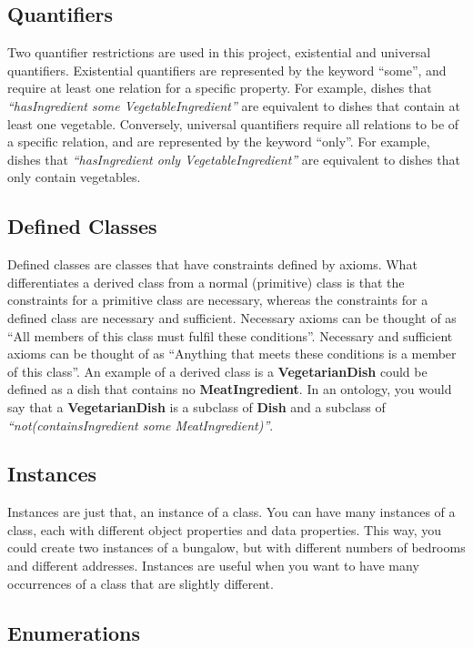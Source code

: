 \subsection{Quantifiers}

Two quantifier restrictions are used in this project, existential and universal quantifiers. Existential quantifiers are represented by the keyword ``some'', and require at least one relation for a specific property. For example, dishes that \textit{``hasIngredient some VegetableIngredient''} are equivalent to dishes that contain at least one vegetable. Conversely, universal quantifiers require all relations to be of a specific relation, and are represented by the keyword ``only''. For example, dishes that \textit{``hasIngredient only VegetableIngredient''} are equivalent to dishes that only contain vegetables.

\subsection{Defined Classes}

Defined classes are classes that have constraints defined by axioms. What differentiates a derived class from a normal (primitive) class is that the constraints for a primitive class are necessary, whereas the constraints for a defined class are necessary and sufficient. Necessary axioms can be thought of as ``All members of this class must fulfil these conditions''. Necessary and sufficient axioms can be thought of as ``Anything that meets these conditions is a member of this class''. An example of a derived class is a \textbf{VegetarianDish} could be defined as a dish that contains no \textbf{MeatIngredient}. In an ontology, you would say that a \textbf{VegetarianDish} is a subclass of \textbf{Dish} and a subclass of \textit{``not(containsIngredient some MeatIngredient)''}.

\subsection{Instances}

Instances are just that, an instance of a class. You can have many instances of a class, each with different object properties and data properties. This way, you could create two instances of a bungalow, but with different numbers of bedrooms and different addresses. Instances are useful when you want to have many occurrences of a class that are slightly different.

\subsection{Enumerations}

